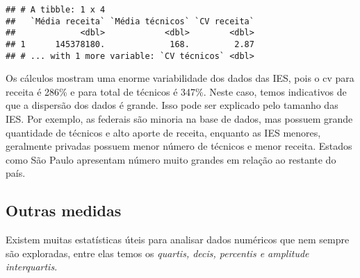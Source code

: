 \documentclass[12pt,]{style/krantz}
\makeatletter
\newenvironment{Shaded}{\begin{snugshade}}{\end{snugshade}}
\newcommand{\KeywordTok}[1]{\textcolor[rgb]{0.13,0.29,0.53}{\textbf{#1}}}
\newcommand{\DataTypeTok}[1]{\textcolor[rgb]{0.13,0.29,0.53}{#1}}
\newcommand{\DecValTok}[1]{\textcolor[rgb]{0.00,0.00,0.81}{#1}}
\newcommand{\StringTok}[1]{\textcolor[rgb]{0.31,0.60,0.02}{#1}}
\newcommand{\OperatorTok}[1]{\textcolor[rgb]{0.81,0.36,0.00}{\textbf{#1}}}
\newcommand{\NormalTok}[1]{#1}
\newenvironment{kframe}{%
\medskip{}
\setlength{\fboxsep}{.8em}
 \def\at@end@of@kframe{}%
 \ifinner\ifhmode%
  \def\at@end@of@kframe{\end{minipage}}%
  \begin{minipage}{\columnwidth}%
 \fi\fi%
 \def\FrameCommand##1{\hskip\@totalleftmargin \hskip-\fboxsep
 \colorbox{shadecolor}{##1}\hskip-\fboxsep
     \hskip-\linewidth \hskip-\@totalleftmargin \hskip\columnwidth}%
 \MakeFramed {\advance\hsize-\width
   \@totalleftmargin\z@ \linewidth\hsize
   \@setminipage}}%
 {\par\unskip\endMakeFramed%
 \at@end@of@kframe}
\renewenvironment{Shaded}{\begin{kframe}}{\end{kframe}}
\theoremstyle{definition}
\theoremstyle{definition}
\theoremstyle{definition}
\theoremstyle{remark}
\makeatother
\begin{document}
\begin{Shaded}
\end{Shaded}

\begin{verbatim}
## # A tibble: 1 x 4
##   `Média receita` `Média técnicos` `CV receita`
##             <dbl>            <dbl>        <dbl>
## 1      145378180.             168.         2.87
## # ... with 1 more variable: `CV técnicos` <dbl>
\end{verbatim}

Os cálculos mostram uma enorme variabilidade dos dados das IES, pois o
cv para receita é 286\% e para total de técnicos é 347\%. Neste caso,
temos indicativos de que a dispersão dos dados é grande. Isso pode ser
explicado pelo tamanho das IES. Por exemplo, as federais são minoria na
base de dados, mas possuem grande quantidade de técnicos e alto aporte
de receita, enquanto as IES menores, geralmente privadas possuem menor
número de técnicos e menor receita. Estados como São Paulo apresentam
número muito grandes em relação ao restante do país.

\subsection{Outras medidas}\label{outras-medidas}

Existem muitas estatísticas úteis para analisar dados numéricos que nem
sempre são exploradas, entre elas temos os \emph{quartis, decis,
percentis e amplitude interquartis}.
\end{document}
